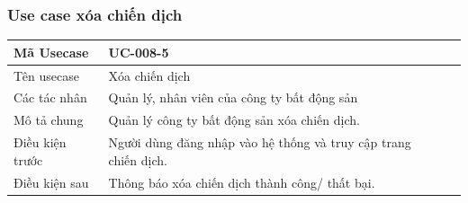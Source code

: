 \documentclass[12pt,a4paper]{article}
\begin{document}
    \subsubsection*{Use case xóa chiến dịch}
    \begin{table}[H]
        \centering
        \begin{tabular}{|p{3.5cm}|p{11.5cm}|c|}
            \hline
            Mã Usecase      & UC-008-5                                                        \\
            \hline
            Tên usecase     & Xóa chiến dịch                                                  \\
            \hline
            Các tác nhân    & Quản lý, nhân viên của công ty bất động sản                     \\
            \hline
            Mô tả chung     & Quản lý công ty bất động sản xóa chiến dịch.                    \\
            \hline

            Điều kiện trước & Người dùng đăng nhập vào hệ thống và truy cập trang chiến dịch. \\
            \hline

            Điều kiện sau   & Thông báo xóa chiến dịch thành công/ thất bại.                  \\
            \hline


\end{tabular}
\end{table}
\end{document}
